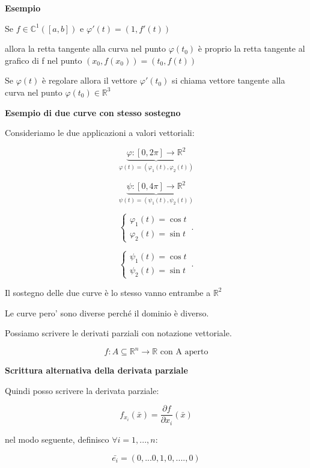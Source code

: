 \documentclass[11pt]{article}
\begin{document}
\textbf{Esempio} 

Se $f \in \mathbb{C}^{1}([a,b])$ e $\varphi'(t) = (1,f'(t))$

allora la retta tangente alla curva nel punto $\varphi(t_0)$ è proprio la retta tangente al grafico di f nel punto $(x_0,f(x_0))=(t_0,f(t))$

Se $\varphi(t)$ è regolare allora il vettore $\varphi'(t_0)$ si chiama vettore tangente alla curva nel punto $\varphi(t_0) \in \mathbb{R}^{3}$

\textbf{Esempio di due curve con stesso sostegno} 

Consideriamo le due applicazioni a valori vettoriali:

\[
    \underbrace{\varphi:[0,2\pi] \rightarrow \mathbb{R}^{2}}_{\varphi(t) = (\varphi_1(t),\varphi_2(t))}
\]

\[
    \underbrace{\psi: [0,4\pi] \rightarrow  \mathbb{R}^{2}}_{\psi(t) = (\psi_1(t),\psi_2(t))}
\]


\begin{equation}
    \begin{cases}
           \varphi_1(t) = \cos t\\
           \varphi_2(t) = \sin t
    \end{cases}\,.
\end{equation}


\begin{equation}
    \begin{cases}
           \psi_1(t) = \cos t\\
           \psi_2(t) = \sin t
    \end{cases}\,.
\end{equation}

Il sostegno delle due curve è lo stesso vanno entrambe a $\mathbb{R}^{2}$

Le curve pero' sono diverse perché il dominio è diverso.


Possiamo scrivere le derivati parziali con notazione vettoriale.

\[
    f: A\subseteq \mathbb{R}^{n}\rightarrow \mathbb{R} \text{ con A aperto}
\]

\textbf{Scrittura alternativa della derivata parziale} 

Quindi posso scrivere la derivata parziale:

\[
f_{x_i} (\bar{x} ) = \frac{\partial f}{\partial x_i}(\bar{x} )
\]

nel modo seguente, definisco $\forall i = 1,...,n$:

\[
    \bar{e_i}  = (0,...0,1,0,....,0) 
\]
\end{document}
